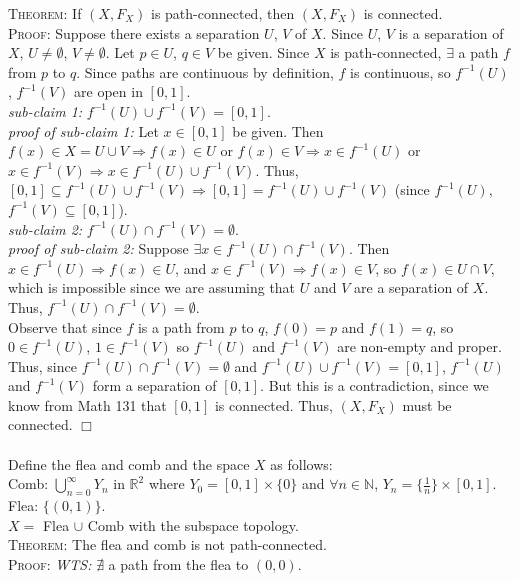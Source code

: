 \documentclass[12pt]{article}
\begin{document}
{\noindent}\textsc{Theorem:} If $(X, F_X)$ is path-connected, then $(X, F_X)$ is connected.
\\ \textsc{Proof:} Suppose there exists a separation $U$, $V$ of $X$. Since $U$, $V$ is a separation of $X$, $U \neq \emptyset$, $V \neq \emptyset$. Let $p \in U$, $q \in V$ be given. Since $X$ is path-connected, $\exists$ a path $f$ from $p$ to $q$. Since paths are continuous by definition, $f$ is continuous, so $f^{-1}(U)$, $f^{-1}(V)$ are open in $[0,1]$. 
\\ \emph{sub-claim 1:} $f^{-1}(U) \cup f^{-1}(V) = [0,1]$. 
\\ \emph{proof of sub-claim 1:} Let $x \in [0,1]$ be given. Then $f(x) \in X = U \cup V \Rightarrow f(x) \in U$ or $f(x) \in V \Rightarrow x \in f^{-1}(U)$ or $x \in f^{-1}(V) \Rightarrow x \in f^{-1}(U) \cup f^{-1}(V)$. Thus, $[0,1] \subseteq f^{-1}(U) \cup f^{-1}(V) \Rightarrow [0,1] = f^{-1}(U) \cup f^{-1}(V)$ (since $f^{-1}(U)$, $f^{-1}(V) \subseteq [0,1]$).
\\ \emph{sub-claim 2:} $f^{-1}(U) \cap f^{-1}(V) = \emptyset$.
\\ \emph{proof of sub-claim 2:} Suppose $\exists x \in f^{-1}(U) \cap f^{-1}(V)$. Then $x \in f^{-1}(U) \Rightarrow f(x) \in U$, and $x \in f^{-1}(V) \Rightarrow f(x) \in V$, so $f(x) \in U \cap V$, which is impossible since we are assuming that $U$ and $V$ are a separation of $X$. Thus, $f^{-1}(U) \cap f^{-1}(V) = \emptyset$.
\\ Observe that since $f$ is a path from $p$ to $q$, $f(0) = p$ and $f(1) = q$, so $0 \in f^{-1}(U)$, $1 \in f^{-1}(V)$ so $f^{-1}(U)$ and $f^{-1}(V)$ are non-empty and proper. Thus, since $f^{-1}(U) \cap f^{-1}(V) = \emptyset$ and $f^{-1}(U) \cup f^{-1}(V) = [0,1]$, $f^{-1}(U)$ and $f^{-1}(V)$ form a separation of $[0,1]$. But this is a contradiction, since we know from Math 131 that $[0,1]$ is connected. Thus, $(X, F_X)$ must be connected. $\Box$
\\ \\Define the flea and comb and the space $X$ as follows: 
\\Comb: $\bigcup_{n=0}^{\infty} Y_n$ in $\mathbb{R}^2$ where $Y_0 = [0,1] \times \{0\}$ and $\forall n \in \mathbb{N}$, $Y_n = \{\frac{1}{n}\} \times [0,1]$. 
\\Flea: $\{(0,1)\}$.
\\$X = $ Flea $\cup$ Comb with the subspace topology.
\\ \textsc{Theorem:} The flea and comb is not path-connected.
\\ \textsc{Proof:} \emph{WTS:} $\nexists$ a path from the flea to $(0,0)$. 
\end{document}

